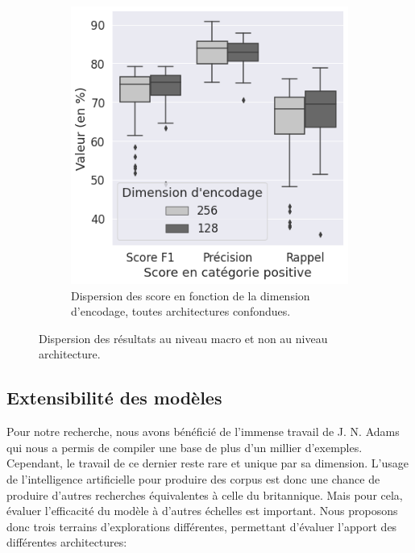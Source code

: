{\begin{figure}[h]
            \begin{subfigure}{0.30\linewidth}%
                \centering
                \includegraphics[width=\linewidth]{figures/chap4/main-encodingdimension.png}
                \caption{Dispersion des score en fonction de la dimension d'encodage, toutes architectures confondues.}
                \label{fig:chap4:main-results-dispersion-dimension}
            \end{subfigure}
            \caption{Dispersion des résultats au niveau macro et non au niveau architecture.}
    \end{figure}%
    \clearpage
}

\subsection{Extensibilité des modèles}

Pour notre recherche, nous avons bénéficié de l'immense travail de J. N. Adams qui nous a permis de compiler une base de plus d'un millier d'exemples. Cependant, le travail de ce dernier reste rare et unique par sa dimension. L'usage de l'intelligence artificielle pour produire des corpus est donc une chance de produire d'autres recherches équivalentes à celle du britannique. Mais pour cela, évaluer l'efficacité du modèle à d'autres échelles est important. Nous proposons donc trois terrains d'explorations différentes, permettant d'évaluer l'apport des différentes architectures:


